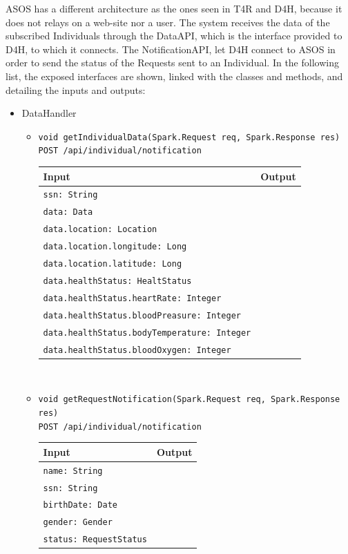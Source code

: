 \documentclass[a4paper, hidelinks, 12pt]{report}
\begin{document}
	ASOS has a different architecture as the ones seen in T4R and D4H, because it does not relays on a web-site nor a user. The system receives the data of the subscribed Individuals through the DataAPI, which is the interface provided to D4H, to which it connects. The NotificationAPI, let D4H connect to ASOS in order to send the status of the Requests sent to an Individual.  In the following list, the exposed interfaces are shown, linked with the classes and methods, and detailing the inputs and outputs:
	
	\begin{itemize}
		\item{DataHandler}
			\begin{itemize}
				\item{\verb|void getIndividualData(Spark.Request req, Spark.Response res)|\\ \verb|POST /api/individual/notification|}\\
				\begin{tabular}{l | l}
				\textbf{Input} & \textbf{Output} \\
				\hline
					\verb|ssn: String| & \\
					\verb|data: Data| & \\
					\verb|data.location: Location| & \\
					\verb|data.location.longitude: Long| & \\
					\verb|data.location.latitude: Long| & \\
					\verb|data.healthStatus: HealtStatus| & \\
					\verb|data.healthStatus.heartRate: Integer| & \\
					\verb|data.healthStatus.bloodPreasure: Integer| & \\
					\verb|data.healthStatus.bodyTemperature: Integer| & \\
					\verb|data.healthStatus.bloodOxygen: Integer| & \\
				\end{tabular}\\
				\item{\verb|void getRequestNotification(Spark.Request req, Spark.Response res)|\\ \verb|POST /api/individual/notification|}\\
				\begin{tabular}{l | l}
				\textbf{Input} & \textbf{Output} \\
				\hline
					\verb|name: String| & \\
					\verb|ssn: String| & \\
					\verb|birthDate: Date| & \\
					\verb|gender: Gender| & \\
					\verb|status: RequestStatus| & \\
				\end{tabular}\\
			\end{itemize}
	\end{itemize}
\end{document}
